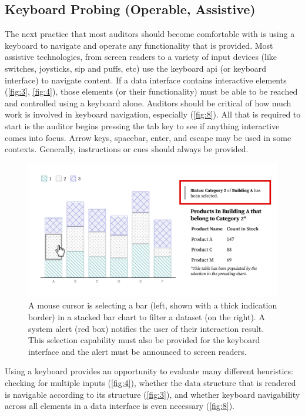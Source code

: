 \documentclass{egpubl}
\begin{document}
\subsection{Keyboard Probing (Operable, Assistive)}
The next practice that most auditors should become comfortable with is using a keyboard to navigate and operate any functionality that is provided. Most assistive technologies, from screen readers to a variety of input devices (like switches, joysticks, sip and puffs, etc) use the keyboard api (or keyboard interface) to navigate content. If a data interface contains interactive elements (\autoref{fig:3}, \autoref{fig:4}), those elements (or their functionality) must be able to be reached and controlled using a keyboard alone. Auditors should be critical of how much work is involved in keyboard navigation, especially (\autoref{fig:8}). All that is required to start is the auditor begins pressing the tab key to see if anything interactive comes into focus. Arrow keys, spacebar, enter, and escape may be used in some contexts. Generally, instructions or cues should always be provided.

\begin{figure}
    \centering
    \includegraphics[width=\linewidth]{figures/figure 4.png}
    \caption{A mouse cursor is selecting a bar (left, shown with a thick indication border) in a stacked bar chart to filter a dataset (on the right). A system alert (red box) notifies the user of their interaction result. This selection capability must also be provided for the keyboard interface and the alert must be announced to screen readers.}
    \label{fig:4}
\end{figure}

Using a keyboard provides an opportunity to evaluate many different heuristics: checking for multiple inputs (\autoref{fig:4}), whether the data structure that is rendered is navigable according to its structure (\autoref{fig:3}), and whether keyboard navigability across all elements in a data interface is even necessary (\autoref{fig:8}).
\end{document}
